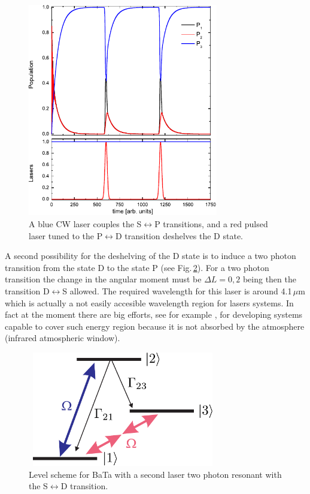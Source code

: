 \begin{figure}[ht!]
\includegraphics[width=8.3cm, height=9.3cm]{imgs/nsDeshelving.pdf}
\caption{\label{nsDeshelving} A blue CW laser couples the S$\leftrightarrow$P transitions, and a red pulsed laser tuned to the P$\leftrightarrow$D transition deshelves the D state.}
\end{figure}

A second possibility for the deshelving of the D state is to induce a two photon transition from the state D to the state P (see Fig.\,\ref{levelscheme4}). For a two photon transition the change in the angular moment must be $\Delta L=0,2$ being then the transition D$\leftrightarrow$S allowed. The required wavelength for this laser is around 4.1\,$\mu$m which is actually a not easily accesible wavelength region for lasers systems. In fact at the moment there are big efforts, see for example \cite{Evans12}, for developing systems capable to cover such energy region because it is not absorbed by the atmosphere (infrared atmospheric window).

\begin{figure}[ht!]
\includegraphics[width=8.3cm, height=5cm]{imgs/levelscheme4.pdf}
\caption{\label{levelscheme4} Level scheme for BaTa with a second laser two photon resonant with the S$\leftrightarrow$D transition.}
\end{figure}

